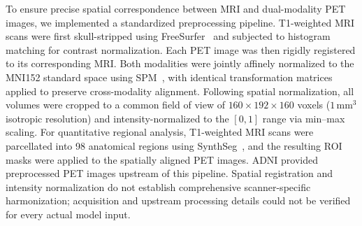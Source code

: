 To ensure precise spatial correspondence between MRI and dual-modality PET images, we implemented a standardized preprocessing pipeline. T1-weighted MRI scans were first skull-stripped using FreeSurfer~\cite{Freesurfer} and subjected to histogram matching for contrast normalization. Each PET image was then rigidly registered to its corresponding MRI. Both modalities were jointly affinely normalized to the MNI152 standard space using SPM~\cite{spm,friston1995spatial}, with identical transformation matrices applied to preserve cross-modality alignment. Following spatial normalization, all volumes were cropped to a common field of view of $160 \times 192 \times 160$ voxels ($1\,\text{mm}^3$ isotropic resolution) and intensity-normalized to the $[0, 1]$ range via min–max scaling. For quantitative regional analysis, T1-weighted MRI scans were parcellated into 98 anatomical regions using SynthSeg~\cite{synthseg}, and the resulting ROI masks were applied to the spatially aligned PET images. ADNI provided preprocessed PET images upstream of this pipeline. Spatial registration and intensity normalization do not establish comprehensive scanner-specific harmonization; acquisition and upstream processing details could not be verified for every actual model input.

